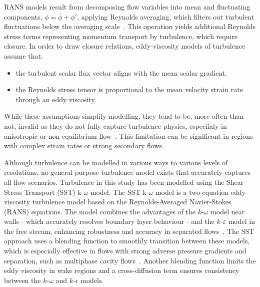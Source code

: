 RANS models result from decomposing flow variables into
 mean and fluctuating components, $\displaystyle \phi = \overline{\phi} + \phi'$, applying Reynolds averaging,
 which filters out turbulent fluctuations below the
 averaging scale~\cite{besnardTurbulenceMultiphaseFlow1988a, hirschNumericalComputationInternal2007}.
 This operation yields additional Reynolds stress terms representing
 momentum transport by turbulence, which require closure.
 In order to draw closure relations, eddy-viscosity models of turbulence assume that:
 \begin{itemize}
    \item the turbulent scalar flux vector aligns with the mean scalar gradient.
    \item the Reynolds stress tensor is proportional to the mean velocity strain rate through an eddy viscosity.
 \end{itemize}
 While these assumptions simplify modelling, they tend to be, more often than not, invalid
 as they do not fully capture turbulence physics, especiialy in anisotropic 
 or non-equilibrium flow~\cite{popeTurbulentFlows2015}. This limitation can be significant
 in regions with complex strain rates or strong secondary flows.

Although turbulence can be modelled in various ways to various levels of resolutions,
 no general purpose turbulence model exists that accurately captures all flow scenarios.
 Turbulence in this study has been modelled using the Shear Stress Transport (SST) k-$\omega$ model.
 The SST k-$\omega$ model is a two-equation eddy-viscosity turbulence model
 based on the Reynolds-Averaged Navier-Stokes (RANS) equations.
 The model combines the advantages of the $k$-$\omega$ model near walls - which
 accurately resolves boundary layer behaviour - and the $k$-$\varepsilon$ model in
 the free stream, enhancing robustness and accuracy in separated flows~\cite{wilcoxTurbulenceModelingCFD2006}.
 The SST approach uses a blending function to smoothly transition between these models,
 which is especially effective in flows with strong adverse pressure gradients and separation,
 such as multiphase cavity flows~\cite{Menter1994}. Another blending function limits the eddy viscosity 
 in wake regions and a cross-diffusion term ensures consistency between the $k$-$\omega$ and $k$-$\epsilon$
 models.

